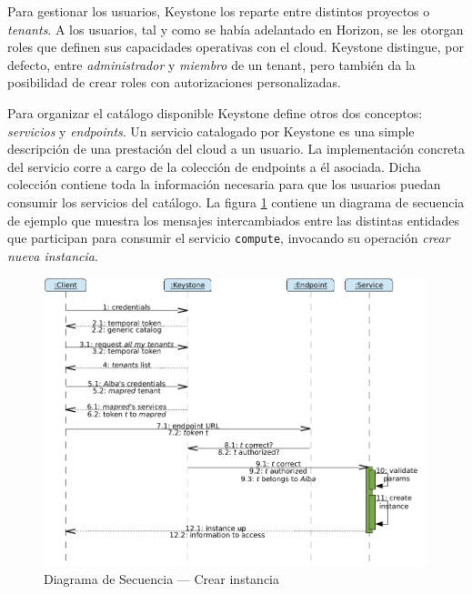Para gestionar los usuarios, Keystone los reparte entre distintos proyectos o \emph{tenants}. A los usuarios, tal y como se hab\'ia adelantado en Horizon, se les otorgan roles que definen sus capacidades operativas con el cloud. Keystone distingue, por defecto, entre \emph{administrador} y \emph{miembro} de un tenant, pero tambi\'en da la posibilidad de crear roles con autorizaciones personalizadas.\newline

Para organizar el cat\'alogo disponible Keystone define otros dos conceptos: \emph{servicios} y \emph{endpoints}. Un servicio catalogado por Keystone es una simple des\-crip\-ci\'on de una prestaci\'on del cloud a un usuario. La implementaci\'on concreta del servicio corre a cargo de la colecci\'on de endpoints a \'el asociada. Dicha colecci\'on contiene toda la informaci\'on necesaria para que los usuarios puedan consumir los servicios del cat\'alogo. La figura \ref{fig:secuenciais} contiene un diagrama de secuencia de ejemplo que muestra los mensajes intercambiados entre las distintas entidades que participan para consumir el servicio \texttt{compute}, invocando su operaci\'on \emph{crear nueva instancia}.\newline

\begin{figure}[tbp]
\begin{center}
\includegraphics[width=0.99\textwidth]{imagenes/013.pdf}
 \caption{Diagrama de Secuencia --- Crear instancia}
\label{fig:secuenciais}
\end{center}
\end{figure}

